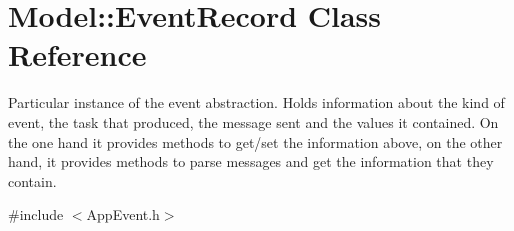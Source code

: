 \hypertarget{class_model_1_1_event_record}{\section{Model\-:\-:Event\-Record Class Reference}
\label{class_model_1_1_event_record}
}


Particular instance of the event abstraction. Holds information about the kind of event, the task that produced, the message sent and the values it contained. On the one hand it provides methods to get/set the information above, on the other hand, it provides methods to parse messages and get the information that they contain.  




{\ttfamily \#include $<$App\-Event.\-h$>$}

